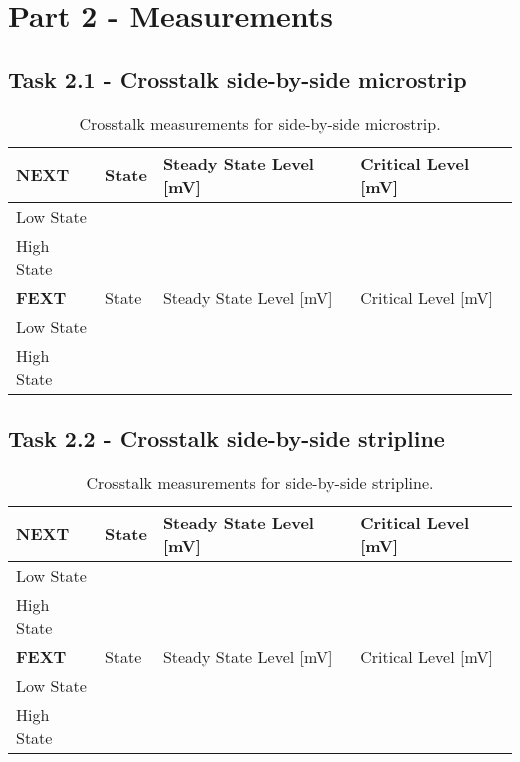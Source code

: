 \documentclass[../main.tex]{subfiles}
\begin{document}
\section{Part 2 - Measurements}

\subsection{Task 2.1 - Crosstalk side-by-side microstrip}

\begin{table}[h]
    \centering
    \begin{tabular}{l|l l l}
        \toprule[1pt]
        \textbf{NEXT} & State & Steady State Level [mV] & Critical Level [mV] \\
        \midrule
        Low State & & & \\
        High State & & & \\
        \midrule[1pt]
        \textbf{FEXT} & State & Steady State Level [mV] & Critical Level [mV] \\
        \midrule
        Low State & & & \\
        High State & & & \\
        \bottomrule[1pt]
    \end{tabular}
    \caption{Crosstalk measurements for side-by-side microstrip.}
    \label{tab:meas-side-by-side-microstrip}
\end{table}

\subsection{Task 2.2 - Crosstalk side-by-side stripline}

\begin{table}[h]
    \centering
    \begin{tabular}{l|l l l}
        \toprule[1pt]
        \textbf{NEXT} & State & Steady State Level [mV] & Critical Level [mV] \\
        \midrule
        Low State & & & \\
        High State & & & \\
        \midrule[1pt]
        \textbf{FEXT} & State & Steady State Level [mV] & Critical Level [mV] \\
        \midrule
        Low State & & & \\
        High State & & & \\
        \bottomrule[1pt]
    \end{tabular}
    \caption{Crosstalk measurements for side-by-side stripline.}
    \label{tab:meas-side-by-side-stripline}
\end{table}
\end{document}
